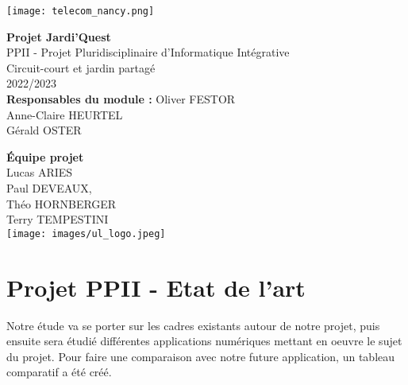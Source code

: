 \documentclass{report}
\begin{document}
 
\author{Lucas ARIES, Paul DEVEAUX, Théo HORNBERGER, Terry TEMPESTINI}
\date{20 Octobre 2022}

\begin{center}
    \texttt{[image: telecom\_nancy.png]}
\end{center}

\begin{center}
    {\huge \textbf{Projet Jardi'Quest}} \\
    {\LARGE 
        PPII - Projet Pluridisciplinaire d'Informatique Intégrative \\
        Circuit-court et jardin partagé \\
        2022/2023
    }
    \vspace{1cm} \\
    {\LARGE \textbf{Responsables du module :}}
    \vskip 0.1cm
    {\Large 
    Oliver FESTOR \\ 
    Anne-Claire HEURTEL \\ 
    Gérald OSTER \\
    } 
    
    
    \vspace{1.3cm}
    {\LARGE \textbf{Équipe projet}} \\ 
    \vspace{0.2cm}
    \Large Lucas ARIES \\
    Paul DEVEAUX, \\ 
    Théo HORNBERGER \\
    Terry TEMPESTINI\\
    \vspace{3cm}
    \texttt{[image: images/ul\_logo.jpeg]}  
\end{center}



\tableofcontents





\chapter{Projet PPII - Etat de l'art}

    Notre étude va se porter sur les cadres existants autour de notre projet, puis ensuite sera étudié différentes applications numériques mettant en oeuvre le sujet du projet. Pour faire une comparaison avec notre future application, un tableau comparatif a été créé. 
\end{document}
